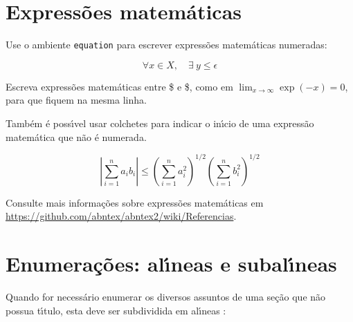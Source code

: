 \section{Express\~{o}es matem\'{a}ticas}

Use o ambiente \texttt{equation} para escrever
express\~{o}es matem\'{a}ticas numeradas:

\begin{equation}
  \forall x \in X, \quad \exists \: y \leq \epsilon
\end{equation}

Escreva express\~{o}es matem\'{a}ticas entre \$ e \$, como em $ \lim_{x \to \infty}
\exp(-x) = 0 $, para que fiquem na mesma linha.

Tamb\'{e}m \'{e} poss\'{\i}vel usar colchetes para indicar o in\'{\i}cio de uma express\~{a}o
matem\'{a}tica que n\~{a}o \'{e} numerada.

\[
\left|\sum_{i=1}^n a_ib_i\right|
\le
\left(\sum_{i=1}^n a_i^2\right)^{1/2}
\left(\sum_{i=1}^n b_i^2\right)^{1/2}
\]

Consulte mais informa\c{c}\~{o}es sobre express\~{o}es matem\'{a}ticas em
\url{https://github.com/abntex/abntex2/wiki/Referencias}.

\section{Enumera\c{c}\~{o}es: al\'{\i}neas e subal\'{\i}neas}

Quando for necess\'{a}rio enumerar
os diversos assuntos de uma se\c{c}\~{a}o que n\~{a}o possua t\'{\i}tulo, esta deve ser
subdividida em al\'{\i}neas \cite[4.2]{NBR6024:2012}:


